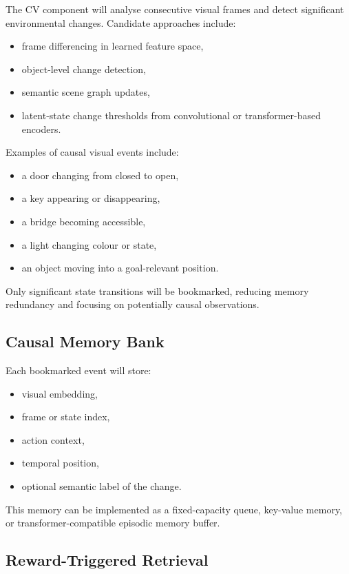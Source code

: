 \documentclass[12pt,a4paper]{article}
\begin{document}
The CV component will analyse consecutive visual frames and detect significant environmental changes. Candidate approaches include:

\begin{itemize}
    \item frame differencing in learned feature space,
    \item object-level change detection,
    \item semantic scene graph updates,
    \item latent-state change thresholds from convolutional or transformer-based encoders.
\end{itemize}

Examples of causal visual events include:
\begin{itemize}
    \item a door changing from closed to open,
    \item a key appearing or disappearing,
    \item a bridge becoming accessible,
    \item a light changing colour or state,
    \item an object moving into a goal-relevant position.
\end{itemize}

Only significant state transitions will be bookmarked, reducing memory redundancy and focusing on potentially causal observations.

\subsection{Causal Memory Bank}

Each bookmarked event will store:
\begin{itemize}
    \item visual embedding,
    \item frame or state index,
    \item action context,
    \item temporal position,
    \item optional semantic label of the change.
\end{itemize}

This memory can be implemented as a fixed-capacity queue, key-value memory, or transformer-compatible episodic memory buffer.

\subsection{Reward-Triggered Retrieval}
\end{document}
